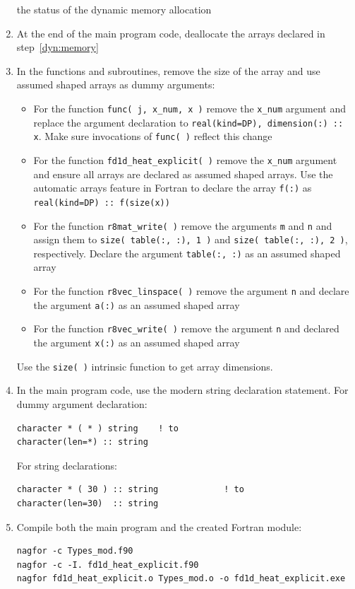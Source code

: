 \documentclass[12pt]{article}
\begin{document}
\begin{enumerate}
the status of the dynamic memory allocation\label{dyn:memory}
\item At the end of the main program code, deallocate the arrays declared in step~\ref{dyn:memory}
\item In the functions and subroutines, remove the size of the array and use assumed shaped
arrays as dummy arguments:
\begin{itemize}
\item For the function \texttt{func( j, x\_num, x )} remove the \texttt{x\_num} argument and
replace the argument declaration to \texttt{real(kind=DP), dimension(:) :: x}. Make sure
invocations of \texttt{func( )} reflect this change
\item For the function \texttt{fd1d\_heat\_explicit( )} remove the \texttt{x\_num} argument
and ensure all arrays are declared as assumed shaped arrays. Use the automatic arrays feature in Fortran
to declare the array \texttt{f(:)} as \texttt{real(kind=DP) :: f(size(x))}
\item For the function \texttt{r8mat\_write( )} remove the arguments \texttt{m} and \texttt{n} and assign them
to \texttt{size( table(:, :), 1 )} and \texttt{size( table(:, :), 2 )}, respectively. Declare the argument \texttt{table(:, :)}
as an assumed shaped array
\item For the function \texttt{r8vec\_linspace( )} remove the argument \texttt{n} and declare the argument \texttt{a(:)} as
an assumed shaped array
\item For the function \texttt{r8vec\_write( )} remove the argument \texttt{n} and declared the argument \texttt{x(:)} as
an assumed shaped array
\end{itemize}
Use the \texttt{size( )} intrinsic function to get array dimensions. 
\item In the main program code, use the modern string declaration statement. For dummy argument
declaration:
\begin{verbatim}
character * ( * ) string    ! to
character(len=*) :: string
\end{verbatim}
For string declarations:
\begin{verbatim}
character * ( 30 ) :: string             ! to
character(len=30)  :: string
\end{verbatim}
\item Compile both the main program and the created Fortran module:
\begin{verbatim}
nagfor -c Types_mod.f90
nagfor -c -I. fd1d_heat_explicit.f90
nagfor fd1d_heat_explicit.o Types_mod.o -o fd1d_heat_explicit.exe

\end{verbatim}
\end{enumerate}
\end{document}
